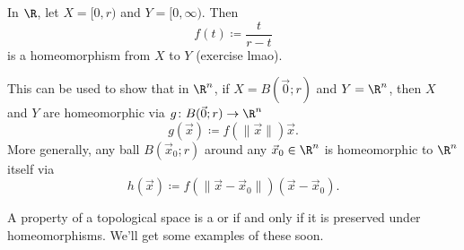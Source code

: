 \documentclass[class=article, crop=false]{standalone}
\begin{document}
\begin{ex}
  In $\R$, let $X = [0,r)$ and $Y=[0,\infty)$. Then
    \[
      f(t) \coloneqq \frac{t}{r-t}
    \]
  is a homeomorphism from $X$ to $Y$ (exercise lmao).

  This can be used to show that in $\R^n$, if $X = B(\vec 0;r)$ and $Y=\R^n$, then $X$ and $Y$ are homeomorphic via $g\colon B(\vec 0;r) \to \R^n$
    \[
      g(\vec x) \coloneqq f(\|\vec x\|) \vec x.
    \]
  More generally, any ball $B(\vec x_0 ;r)$ around any $\vec x_0 \in \R^n$ is homeomorphic to $\R^n$ itself via
    \[
      h(\vec x) \coloneqq f(\|\vec x - \vec x_0\|) (\vec x - \vec x_0).
    \]
\end{ex}

\begin{rem}
  A property of a topological space is a  or  if and only if it is preserved under homeomorphisms. We'll get some examples of these soon.
\end{rem}
\end{document}
